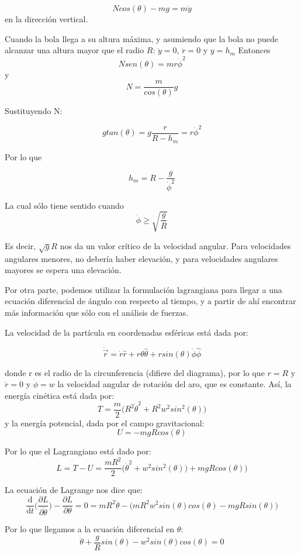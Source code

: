 \documentclass[12p]{article}
\begin{document}
$$Ncos(\theta)-mg=m\ddot{y}$$
en la dirección vertical.

Cuando la bola llega a su altura máxima, y asumiendo que la bola no puede alcanzar una altura mayor que el radio $R$: $\ddot{y}=0$, $\ddot{r}=0$ y $y=h_{m}$
Entonces
$$Nsen(\theta)=mr\dot{\phi}^2$$
y
$$ N=\frac{m}{cos(\theta)}g$$ 

Sustituyendo N:

$$gtan(\theta)=g\frac{r}{R-h_{m}}=r\dot{\phi}^2$$

Por lo que

\begin{equation}
h_{m}=R-\frac{g}{\dot{\phi}^2}
\end{equation}

La cual sólo tiene sentido cuando 
$$\dot{\phi} \geq \sqrt{\frac{g}{R}}$$

Es decir, $\sqrt{g}{R}$ nos da un valor crítico de la velocidad angular. Para velocidades angulares menores, no debería haber elevación, y para velocidades angulares mayores se espera una elevación.

Por otra parte, podemos utilizar la formulación lagrangiana para llegar a una ecuación diferencial de ángulo con respecto al tiempo, y a partir de ahí encontrar más información que sólo con el análisis de fuerzas.

La velocidad de la partícula en coordenadas esféricas está dada por:

$$\dot{\vec{r}}=\dot{r}\hat{r}+r\theta\hat{\theta}+rsin(\theta)\dot{\phi}\hat{\phi}$$

donde r es el radio de la circunferencia (difiere del diagrama), por lo que $r=R$ y $\dot{r}=0$ y $\dot{\phi}=w$ la velocidad angular de rotación del aro, que es constante. Así, la energía cinética está dada por:
$$T=\frac{m}{2}\big(R^2\dot{\theta}^2+R^2w^2sin^2(\theta)\big)$$
y la energía potencial, dada por el campo gravitacional:
$$U=-mgRcos(\theta)$$

Por lo que el Lagrangiano está dado por:
$$L=T-U=\frac{mR^2}{2}\big(\dot{\theta}^2+w^2sin^2(\theta)\big)+mgRcos(\theta)\big)$$

La ecuación de Lagrange nos dice que:
$$\frac{ \mathrm d}{\mathrm d t}\Big(\frac{\partial L}{\partial \dot{\theta}}\Big)-\frac{\partial L}{\partial \theta}=0=mR^2\ddot{\theta}-\big(mR^2w^2sin(\theta)cos(\theta)-mgRsin(\theta)\big)$$

Por lo que llegamos a la ecuación diferencial en $\theta$:
\begin{equation}
\ddot{\theta}+\frac{g}{R}sin(\theta)-w^2sin(\theta)cos(\theta)=0
\end{equation}
\end{document}
